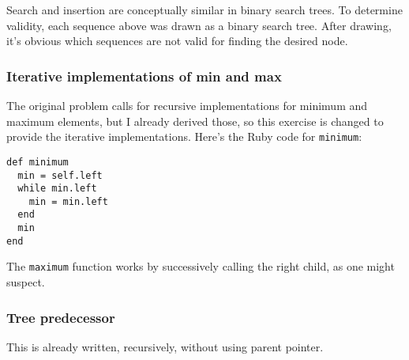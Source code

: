 \documentclass{article}
\begin{document}
Search and insertion are conceptually similar in binary search
trees. To determine validity, each sequence above was drawn as
a binary search tree. After drawing, it's obvious which sequences
are not valid for finding the desired node.




\subsubsection{Iterative implementations of min and max}

The original problem calls for recursive implementations for minimum
and maximum elements, but I already derived those, so this exercise
is changed to provide the iterative implementations. Here's the
Ruby code for \texttt{minimum}:

\begin{lstlisting}[frame=single]
def minimum
  min = self.left
  while min.left
    min = min.left
  end
  min
end
\end{lstlisting}

The \texttt{maximum} function works by successively calling the right
child, as one might suspect.

\subsubsection{Tree predecessor}

This is already written, recursively, without using parent pointer.

\begin{comment}
\subsubsection{Prof. Bunyan's key sorting claim}
\subsubsection{Successor and predecessor for node with 2 children}
\subsubsection{Ancestor nodes}
\subsubsection{In-order walk using minimum and successor}
\subsubsection{Complexity of successive calls to successor}
\subsubsection{Node parent-child key relationship}
\end{comment}
\end{document}
